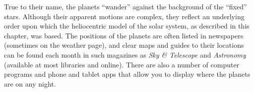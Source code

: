 \documentclass[../../main-astronomy.tex]{subfiles}
\begin{document}
\begin{mdframed}[backgroundcolor=black!10]
    \vspace{1em}
    
    True to their name, the planets ``wander'' against the background of the ``fixed'' stars. Although their apparent motions are complex, they reflect an underlying order upon which the heliocentric model of the solar system, as described in this chapter, was based. The positions of the planets are often listed in newspapers (sometimes on the weather page), and clear maps and guides to their locations can be found each month in such magazines as \textit{Sky \& Telescope} and \textit{Astronomy} (available at most libraries and online). There are also a number of computer programs and phone and tablet apps that allow you to display where the planets are on any night.
\end{mdframed}
\end{document}
